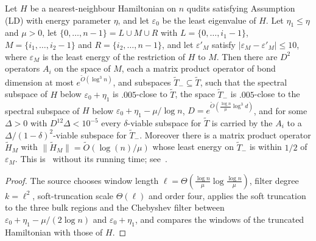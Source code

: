 \begin{lemma}
    \label{thm:alvv_efficient_low_density_agsp}
    \notready
    Let $H$ be a nearest-neighbour Hamiltonian on $n$ qudits satisfying
    Assumption (LD) with energy parameter $\eta$, and let $\varepsilon_0$ be
    the least eigenvalue of $H$. Let $\eta_1\leq\eta$ and $\mu>0$, let
    $\{0,\ldots,n-1\}=L\cup M\cup R$ with $L=\{0,\ldots,i_1-1\}$,
    $M=\{i_1,\ldots,i_2-1\}$ and $R=\{i_2,\ldots,n-1\}$, and let
    $\varepsilon'_M$ satisfy
    $|\varepsilon_M-\varepsilon'_M|\leq10$, where $\varepsilon_M$ is the least
    energy of the restriction of $H$ to $M$. Then there are $D^2$ operators
    $A_i$ on the space of $M$, each a matrix product operator of bond dimension
    at most $e^{\tilde O(\log^3n)}$, and subspaces $\tilde T_-\subseteq\tilde T$,
    such that the spectral subspace of $H$ below $\varepsilon_0+\eta_1$ is
    $.005$-close to $\tilde T$, the space $\tilde T_-$ is $.005$-close to the
    spectral subspace of $H$ below $\varepsilon_0+\eta_1-\mu/\log n$,
    $D=e^{\tilde O(\frac{\log n}{\mu}\log^3d)}$, and for some $\Delta>0$ with
    $D^{12}\Delta<10^{-5}$ every $\delta$-viable subspace for $\tilde T$ is
    carried by the $A_i$ to a $\Delta/(1-\delta)^2$-viable subspace for
    $\tilde T_-$. Moreover there is a matrix product operator $\tilde H_M$ with
    $\|\tilde H_M\|=\tilde O(\log(n)/\mu)$ whose least energy on $\tilde T_-$
    is within $1/2$ of $\varepsilon_M$.
    This is~\cite[Theorem~5.9, lines 1424--1437]{Arad2016RigorousRG} without its
    running time; see~\cite{gap:alvv16_efficient_low_density_agsp}.
\end{lemma}
\begin{proof}\notready
    The source chooses window length
    $\ell=\Theta(\frac{\log n}{\mu}\log\frac{\log n}{\mu})$, filter degree
    $k=\ell^2$, soft-truncation scale $\Theta(\ell)$ and order four, applies
    the soft truncation to the three bulk regions and the Chebyshev filter
    between $\varepsilon_0+\eta_1-\mu/(2\log n)$ and $\varepsilon_0+\eta_1$, and
    compares the windows of the truncated Hamiltonian with those of $H$.
\end{proof}

